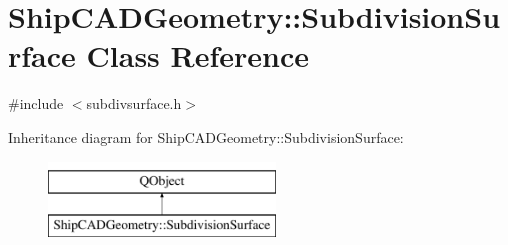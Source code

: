 \hypertarget{classShipCADGeometry_1_1SubdivisionSurface}{\section{Ship\-C\-A\-D\-Geometry\-:\-:Subdivision\-Surface Class Reference}
\label{classShipCADGeometry_1_1SubdivisionSurface}
}


{\ttfamily \#include $<$subdivsurface.\-h$>$}

Inheritance diagram for Ship\-C\-A\-D\-Geometry\-:\-:Subdivision\-Surface\-:\begin{figure}[H]
\begin{center}
\leavevmode
\includegraphics[height=2.000000cm]{classShipCADGeometry_1_1SubdivisionSurface}
\end{center}
\end{figure}
